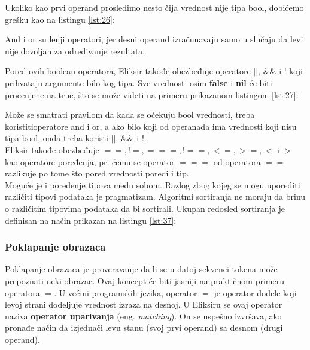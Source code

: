 \documentclass[12pt,oneside]{memoir}
\begin{document}
Ukoliko kao prvi operand prosledimo nesto čija vrednost nije tipa bool, dobićemo grešku kao na listingu \ref{lst:26}:



And i or su lenji operatori, jer desni operand izračunavaju samo u slučaju da levi nije dovoljan za određivanje rezultata.

Pored ovih boolean operatora, Eliksir takođe obezbeđuje operatore $||$, $\&\&$ i $!$ koji prihvataju argumente bilo kog tipa. Sve vrednosti osim \textbf{false} i \textbf{nil} će biti procenjene na true, što se može videti na primeru prikazanom listingom \ref{lst:27}:



Može se smatrati pravilom da kada se očekuju bool vrednosti, treba koristitioperatore and i or, a ako bilo koji od operanada ima vrednosti koji nisu tipa bool, onda treba koristi $||$, $\&\&$ i $!$.\\

Eliksir takođe obezbeđuje $==,! =, ===,! ==, <=,> =, <$ i $ >$ kao operatore poređenja, pri čemu se operator $===$ od operatora $==$ razlikuje po tome što pored vrednosti poredi i tip.\\

Moguće je i poređenje tipova među sobom. Razlog zbog kojeg se mogu uporediti različiti tipovi podataka je pragmatizam. Algoritmi sortiranja ne moraju da brinu o različitim tipovima podataka da bi sortirali. Ukupan redosled sortiranja je definisan na način prikazan na listingu \ref{lst:37}:



\subsubsection{Poklapanje obrazaca}

Poklapanje obrazaca je proveravanje da li se u datoj sekvenci tokena može prepoznati neki obrazac. Ovaj koncept će biti jasniji na praktičnom primeru operatora $=$. U većini programskih jezika, operator $=$ je operator dodele koji levoj strani dodeljuje vrednost izraza na desnoj. U Eliksiru se ovaj operator naziva \textbf{operator uparivanja} (eng. \textit{matching}). On se uspešno izvršava, ako pronađe način da izjednači levu stanu (svoj prvi operand) sa desnom (drugi operand).
\end{document}

